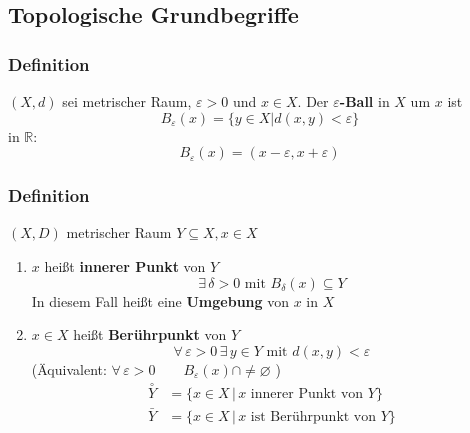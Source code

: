 \subsection{Topologische Grundbegriffe} %
\label{sub:topologische_grundbegriffe}
\subsubsection[$\varepsilon$-Ball]{Definition} %
\label{ssub:definition}
 $(X,d)$ sei metrischer Raum, $\varepsilon >0$ und $x \in X$. Der {\bfseries $\varepsilon $-Ball} in $X$ um $x$ ist
 \[
 	B_{\varepsilon }(x) = \{ y \in X | d(x,y)< \varepsilon \}
 \]
 in $\mathbb{R}$: \[
 	B_{\varepsilon}(x)=(x-\varepsilon ,x+ \varepsilon)
 \]
\subsubsection[Innerer Punkt, Umgebung]{Definition} %
\label{ssub:definition}
$(X,D)$ metrischer Raum $Y \subseteq X, x \in X$
\begin{enumerate}
	\item $x$ heißt {\bfseries innerer Punkt} von $Y$  \[
		\exists\, \delta>0 \text{ mit } B_{\delta }(x) \subseteq Y
	\]
	In diesem Fall heißt eine {\bfseries Umgebung} von $x$ in $X$
	\item $x \in X$ heißt {\bfseries Berührpunkt} von $Y$
	\[
		\forall\, \varepsilon >0 \, \exists\, y \in Y \text{ mit } d(x,y)<\varepsilon 
	\]
	(Äquivalent: $\forall\, \varepsilon > 0 \qquad B_{\varepsilon }(x)\cap \neq \varnothing$ )
	\begin{align*}
		\overset{\circ}{Y}&= \{ x \in X \,|\, x \text{ innerer Punkt von } Y \} \\
		\bar{Y} &= \{ x \in X \,|\, x \text{ ist Berührpunkt von } Y \} 
	\end{align*}
\end{enumerate}
